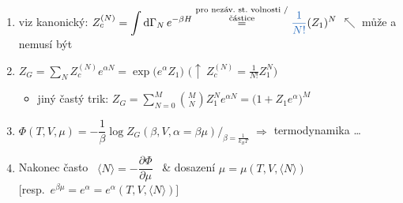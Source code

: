 \begin{veta}
\begin{enumerate}[label=\arabic*),leftmargin=3.5em]
  \item[1) \& 2)] viz kanonický: \quad
        $Z_c^{(N)} = \displaystyle\int\dd\Gamma_N\,e^{-\beta H} \overset{\substack{\text{pro nezáv.\ st.\ volnosti /}\\ \text{částice}}}{=} \textcolor{NavyBlue}{\frac{1}{N!}}(Z_1)^N$
        \quad \textcolor{NavyBlue}{$\nwarrow$ může a nemusí být}
  \item[3)] $Z_G = \displaystyle\sum_N Z_c^{(N)}e^{\alpha N} = \exp\big(e^\alpha Z_1\big)$ \quad
        $\big(\uparrow\ Z_c^{(N)} = \frac{1}{N!}Z_1^N\big)$
        \begin{itemize}[nosep]
          \item jiný častý trik: \quad $Z_G = \displaystyle\sum_{N=0}^{M}\binom MN Z_1^Ne^{\alpha N} = \big(1 + Z_1e^\alpha\big)^M$
        \end{itemize}
  \item[4)] $\Phi(T,V,\mu) = -\dfrac1\beta\log Z_G(\beta,V,\alpha = \beta\mu)\Big/_{\beta = \frac{1}{k_BT}}$ \quad $\Rightarrow$ termodynamika \dots
  \item[5)] Nakonec často \ $\langle N\rangle = -\dfrac{\partial\Phi}{\partial\mu}$ \ \& dosazení $\mu = \mu(T,V,\langle N\rangle)$ \\
        \hspace*{4cm}$\big[$resp.\ $e^{\beta\mu} = e^\alpha = e^\alpha(T,V,\langle N\rangle)\big]$
\end{enumerate}
\end{veta}

